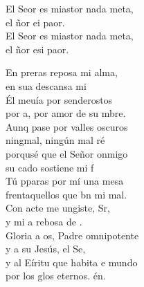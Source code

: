 \begin{cancion}%
	\begin{chorus}%
	El Seor es miastor nada meta,\\
	el ñor ei paor.\\
	El Seor es miastor nada meta,\\
	el ñor esi paor.\\
	\end{chorus}%
	En preras reposa mi alma,\\
	en sua descansa mi \\
	Él meuía por senderostos\\
	por a, por amor de su mbre.\\
	Aunq pase por valles oscuros\\
	ningmal, ningún mal ré\\
	porqusé que el Señor onmigo\\
	su cado sostiene mi f\\
	Tú pparas por mí una mesa\\
	frentaquellos que bn mi mal.\\
	Con acte me ungiste, Sr,\\
	y mi a rebosa de .\\
	Gloria a os, Padre omnipotente\\
	y a su  Jesús, el Se,\\
	y al Eíritu que habita e mundo\\
	por los glos eternos. én.\\
\end{cancion}%
